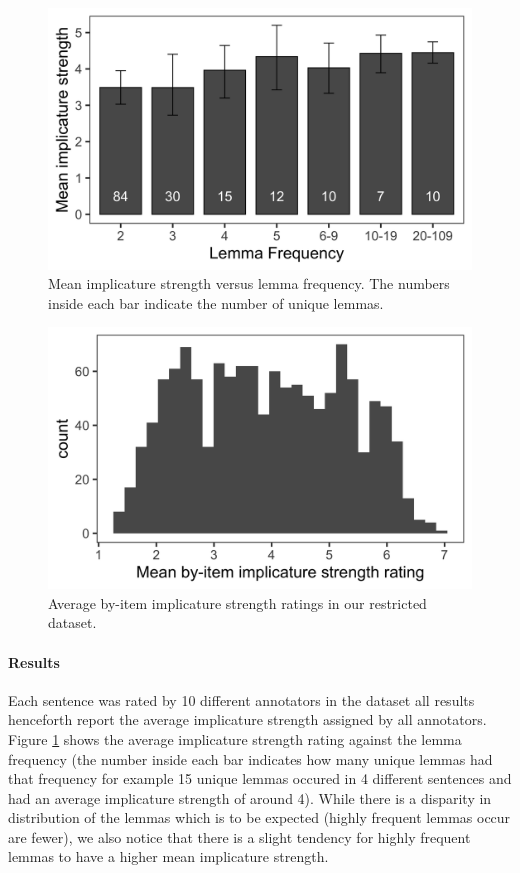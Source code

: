\documentclass[10pt, biblatex]{report}
\begin{document}
\begin{figure}[t]
    \centering
    \includegraphics[width=\linewidth]{images/lemma.png}
    \caption{Mean implicature strength versus lemma frequency. The numbers inside
             each bar indicate the number of unique lemmas.}
    \label{fig:lemma}
\end{figure}

\begin{figure}[t]
    \centering
    \includegraphics[width=\linewidth]{images/dist.png}
    \caption{Average by-item implicature strength ratings in our restricted dataset.}
    \label{fig:dist}
\end{figure}


\paragraph{Results} Each sentence was rated by 10 different annotators in the
dataset \dash all results henceforth report the average implicature strength
assigned by all annotators. Figure \ref{fig:lemma} shows the average implicature
strength rating against the lemma frequency (the number inside each bar indicates
how many unique lemmas had that frequency \dash for example 15 unique lemmas
occured in 4 different sentences and had an average implicature strength of
around 4). While there is a disparity in distribution of the lemmas which is to be
expected (highly frequent lemmas occur are fewer), we also notice that there is
a slight tendency for highly frequent lemmas to have a higher mean
implicature strength.
\end{document}

